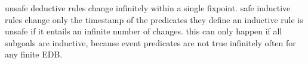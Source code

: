 unsafe deductive rules change infinitely within a single fixpoint. 
safe inductive rules change only the timestamp of the predicates they define
an inductive rule is unsafe if it entails an infinite number of changes.  this can only happen if all subgoals are inductive,
because event predicates are not true infinitely often for any finite EDB.









